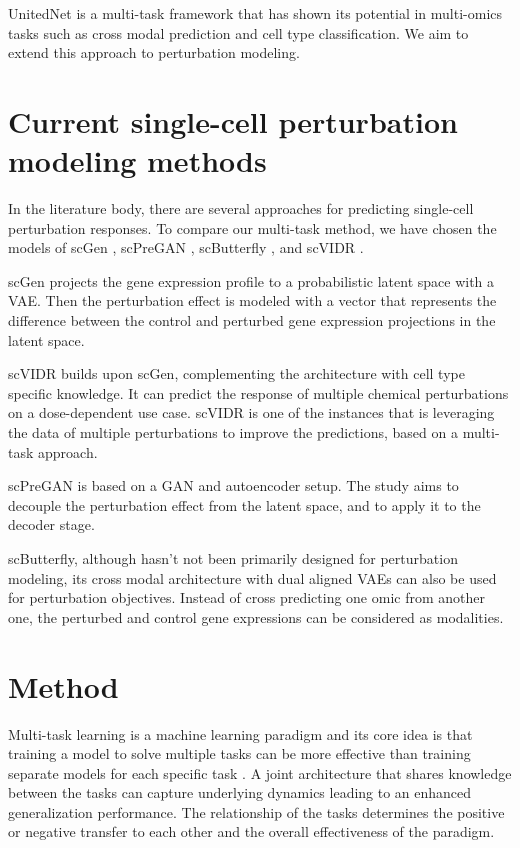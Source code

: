 \documentclass[12pt, a4paper]{article}
\begin{document}
UnitedNet \cite{tangExplainableMultitaskLearning2023} is a multi-task framework that has shown its potential in multi-omics tasks such as cross modal prediction and cell type classification. We aim to extend this approach to perturbation modeling.

\section{Current single-cell perturbation modeling methods}

In the literature body, there are several approaches for predicting single-cell perturbation responses. To compare our multi-task method, we have chosen the models of scGen \cite{lotfollahiScGenPredictsSinglecell2019}, scPreGAN \cite{weiScPreGANDeepGenerative2022}, scButterfly \cite{caoScButterflyVersatileSinglecell2024}, and scVIDR \cite{kanaGenerativeModelingSinglecell2023}.

scGen projects the gene expression profile to a probabilistic latent space with a VAE. Then the perturbation effect is modeled with a vector that represents the difference between the control and perturbed gene expression projections in the latent space.

scVIDR builds upon scGen, complementing the architecture with cell type specific knowledge. It can predict the response of multiple chemical perturbations on a dose-dependent use case. scVIDR is one of the instances that is leveraging the data of multiple perturbations to improve the predictions, based on a multi-task approach. 

scPreGAN is based on a GAN and autoencoder setup. The study aims to decouple the perturbation effect from the latent space, and to apply it to the decoder stage.

scButterfly, although hasn't not been primarily designed for perturbation modeling, its cross modal architecture with dual aligned VAEs can also be used for perturbation objectives. Instead of cross predicting one omic from another one, the perturbed and control gene expressions can be considered as modalities.


\section{Method}

Multi-task learning is a machine learning paradigm and its core idea is that training a model to solve multiple tasks can be more effective than training separate models for each specific task \cite{zhangSurveyMultiTaskLearning2021}. A joint architecture that shares knowledge between the tasks can capture underlying dynamics leading to an enhanced generalization performance.
The relationship of the tasks determines the positive or negative transfer to each other and the overall effectiveness of the paradigm.
\end{document}
